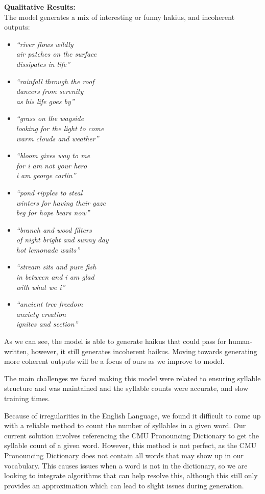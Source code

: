 \documentclass{article} %
\begin{document}
\textbf{Qualitative Results:} \\
The model generates a mix of interesting or funny hakius, and incoherent outputs:
\begin{itemize}
  \item \textit{“river flows wildly \\
  air patches on the surface \\
  dissipates in life”}
  \item \textit{“rainfall through the roof \\
  dancers from serenity \\
  as his life goes by”}
  \item \textit{“grass on the wayside \\
  looking for the light to come \\
  warm clouds and weather”}
  \item \textit{“bloom gives way to me \\
  for i am not your hero \\ 
  i am george carlin”}
  \item \textit{“pond ripples to steal \\
  winters for having their gaze \\
  beg for hope bears now”}
  \item \textit{“branch and wood filters \\
  of night bright and sunny day \\
  hot lemonade waits”}
  \item \textit{“stream sits and pure fish \\
  in between and i am glad \\
  with what we i”}
  \item \textit{“ancient tree freedom \\
  anxiety creation \\
  ignites and section”}
\end{itemize}

As we can see, the model is able to generate haikus that could pass for human-written, however, it still generates
incoherent haikus. Moving towards generating more coherent outputs will be a focus of ours as we improve to model.

The main challenges we faced making this model were 
related to ensuring syllable structure and was maintained and the syllable counts were accurate, and 
slow training times.

Because of irregularities in the English Language, we found it difficult to
come up with a reliable method to count the number of syllables in a given word. Our current solution involves referencing 
the CMU Pronouncing Dictionary \citep{cmu_pronouncing_dictionary} to get the syllable count of a given word.
However, this method is not perfect, as the CMU Pronouncing Dictionary does not contain all words that may show up in our vocabulary.
This causes issues when a word is not in the dictionary, so we are looking to integrate algorithms that can help resolve this, although this still only provides an approximation which can lead to slight issues during generation.
\end{document}
